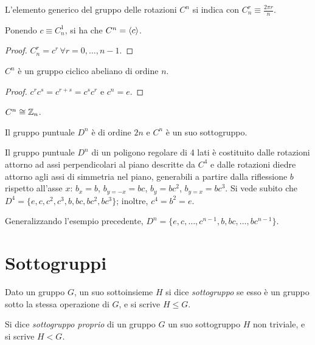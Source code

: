 \begin{definition}
	L'elemento generico del gruppo delle rotazioni $ C^n $ si indica con $ C_n^r \equiv \frac{2\pi r}{n} $.
\end{definition}

\begin{proposition}
	Ponendo $ c \equiv C_n^1 $, si ha che $ C^n = \braket{c} $.
\end{proposition}
\begin{proof}
	$ C_n^r = c^r \,\forall r = 0, \dots, n - 1 $.
\end{proof}

\begin{proposition}
	$ C^n $ è un gruppo ciclico abeliano di ordine $ n $.
\end{proposition}
\begin{proof}
	$ c^r c^s = c^{r + s} = c^s c^r $ e $ c^n = e $.
\end{proof}

\begin{proposition}
	$ C^n \cong \mathbb{Z}_n $.
\end{proposition}

\begin{proposition}
	Il gruppo puntuale $ D^n $ è di ordine $ 2n $ e $ C^n $ è un suo sottogruppo.
\end{proposition}

\begin{example}
	Il gruppo puntuale $ D^n $ di un poligono regolare di 4 lati è costituito dalle rotazioni attorno ad assi perpendicolari al piano descritte da $ C^4 $ e dalle rotazioni diedre attorno agli assi di simmetria nel piano, generabili a partire dalla riflessione $ b $ rispetto all'asse $ x $: $ b_x = b $, $ b_{y = -x} = bc $, $ b_y = bc^2 $, $ b_{y = x} = bc^3 $. Si vede subito che $ D^4 = \{e,c,c^2,c^3,b,bc,bc^2,bc^3\} $; inoltre, $ c^4 = b^2 = e $.
\end{example}
\begin{example}
	Generalizzando l'esempio precedente, $ D^n = \{e,c,\dots,c^{n-1},b,bc,\dots,bc^{n-1}\} $.
\end{example}

\section{Sottogruppi}

\begin{definition}
	Dato un gruppo $ G $, un suo sottoinsieme $ H $ si dice \textit{sottogruppo} se esso è un gruppo sotto la stessa operazione di $ G $, e si scrive $ H \le G $.
\end{definition}
\begin{definition}
	Si dice \textit{sottogruppo proprio} di un gruppo $ G $ un suo sottogruppo $ H $ non triviale, e si scrive $ H < G $.
\end{definition}

